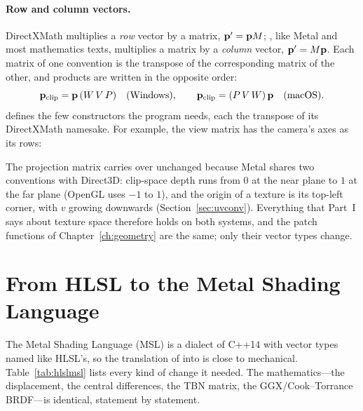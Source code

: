 \paragraph{Row and column vectors.} DirectXMath multiplies a \emph{row} vector by a matrix,
$\mathbf{p}'=\mathbf{p}M$; , like Metal and most mathematics texts, multiplies a matrix by
a \emph{column} vector, $\mathbf{p}'=M\mathbf{p}$. Each matrix of one convention is the transpose of
the corresponding matrix of the other, and products are written in the opposite order:
\[
  \mathbf{p}_{\mathrm{clip}} = \mathbf{p}\,(W\,V\,P) \quad\text{(Windows)},\qquad
  \mathbf{p}_{\mathrm{clip}} = (P\,V\,W)\,\mathbf{p} \quad\text{(macOS)}.
\]
 defines the few constructors the program needs, each the transpose of
its DirectXMath namesake. For example, the view matrix has the camera's axes as its rows:


The projection matrix carries over unchanged because Metal shares two conventions with Direct3D:
clip-space depth runs from $0$ at the near plane to $1$ at the far plane (OpenGL uses $-1$ to
$1$), and the origin of a texture is its top-left corner, with $v$ growing downwards
(Section~\ref{sec:uvconv}). Everything that Part~I says about texture space therefore holds on
both systems, and the patch functions of Chapter~\ref{ch:geometry} are the same; only their
vector types change.


\section{From HLSL to the Metal Shading Language}
\label{sec:msl}
The Metal Shading Language (MSL) is a dialect of C++14 with vector types named like HLSL's,
so the translation of  into  is close to
mechanical. Table~\ref{tab:hlslmsl} lists every kind of change it needed. The mathematics---the
displacement, the central differences, the TBN matrix, the GGX/Cook--Torrance BRDF---is
identical, statement by statement.

